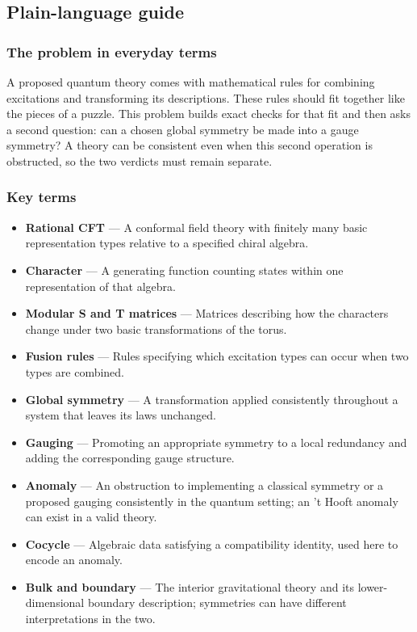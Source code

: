 \documentclass[
  11pt,
]{article}
\begin{document}
\subsection{Plain-language guide}

\subsubsection{The problem in everyday terms}

A proposed quantum theory comes with mathematical rules for combining
excitations and transforming its descriptions. These rules should fit
together like the pieces of a puzzle. This problem builds exact checks
for that fit and then asks a second question: can a chosen global
symmetry be made into a gauge symmetry? A theory can be consistent even
when this second operation is obstructed, so the two verdicts must
remain separate.

\subsubsection{Key terms}

\begin{itemize}
\item
  \textbf{Rational CFT} --- A conformal field theory with finitely many
  basic representation types relative to a specified chiral algebra.
\item
  \textbf{Character} --- A generating function counting states within
  one representation of that algebra.
\item
  \textbf{Modular S and T matrices} --- Matrices describing how the
  characters change under two basic transformations of the torus.
\item
  \textbf{Fusion rules} --- Rules specifying which excitation types can
  occur when two types are combined.
\item
  \textbf{Global symmetry} --- A transformation applied consistently
  throughout a system that leaves its laws unchanged.
\item
  \textbf{Gauging} --- Promoting an appropriate symmetry to a local
  redundancy and adding the corresponding gauge structure.
\item
  \textbf{Anomaly} --- An obstruction to implementing a classical
  symmetry or a proposed gauging consistently in the quantum setting; an
  't Hooft anomaly can exist in a valid theory.
\item
  \textbf{Cocycle} --- Algebraic data satisfying a compatibility
  identity, used here to encode an anomaly.
\item
  \textbf{Bulk and boundary} --- The interior gravitational theory and
  its lower-dimensional boundary description; symmetries can have
  different interpretations in the two.
\end{itemize}
\end{document}
